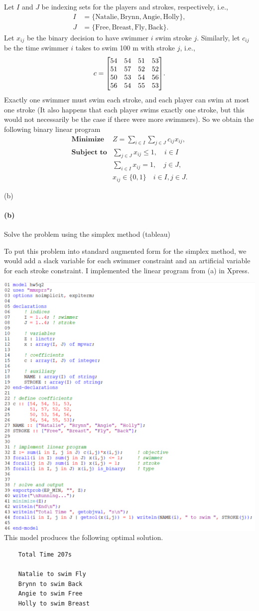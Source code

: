 \documentclass[12pt]{article}
\newenvironment{fullbox}{\begin{lrbox}{\savefullbox}\begin{minipage}{\dimexpr\textwidth-2\fboxsep\relax}}{\end{minipage}\end{lrbox}\begin{center}\framebox[\textwidth]{\usebox{\savefullbox}}\end{center}}
\newenvironment{pbox}[1][]{\begin{fullbox}\ifx#1\empty\else\paragraph{#1}\fi}{\end{fullbox}}
\theoremstyle{definition}
\newcommand{\ds}{\displaystyle}
\begin{document}
Let $I$ and $J$ be indexing sets for the players and strokes, respectively, i.e.,
\begin{align*}
    I &= \{\text{Natalie}, \text{Brynn}, \text{Angie}, \text{Holly}\}, \\
    J &= \{\text{Free}, \text{Breast}, \text{Fly}, \text{Back}\}.
\end{align*}
Let $x_{ij}$ be the binary decision to have swimmer $i$ swim stroke $j$. Similarly, let $c_{ij}$ be the time swimmer $i$ takes to swim 100 m with stroke $j$, i.e.,
\[
    c = \mqty[54 & 54 & 51 & 53 \\ 51 & 57 & 52 & 52 \\ 50 & 53 & 54 & 56 \\ 56 & 54 & 55 & 53].
\]
Exactly one swimmer must swim each stroke, and each player can swim at most one stroke (It also happens that each player swims exactly one stroke, but this would not necessarily be the case if there were more swimmers). So we obtain the following binary linear program
\[\begin{array}{ll}
    \textbf{Minimize} & Z = \ds\sum_{i\in I} \sum_{j\in J} c_{ij}x_{ij}, \\
    \textbf{Subject to} & \ds\sum_{j\in J} x_{ij} \leq 1, \quad i \in I \\
        & \ds\sum_{i\in I} x_{ij} = 1, \quad j \in J, \\
        & x_{ij} \in \{0, 1\} \quad i \in I, j \in J.
\end{array}\]

\newpage
\begin{pbox}[(b)]
    Solve the problem using the simplex method (tableau)
\end{pbox}

To put this problem into standard augmented form for the simplex method, we would add a slack variable for each swimmer constraint and an artificial variable for each stroke constraint. I implemented the linear program from (a) in Xpress.

\noindent
\includegraphics[width=\textwidth]{code2.png}
This model produces the following optimal solution.
\begin{verbatim}
    Total Time 207s

    Natalie to swim Fly
    Brynn to swim Back
    Angie to swim Free
    Holly to swim Breast
\end{verbatim}
\end{document}

